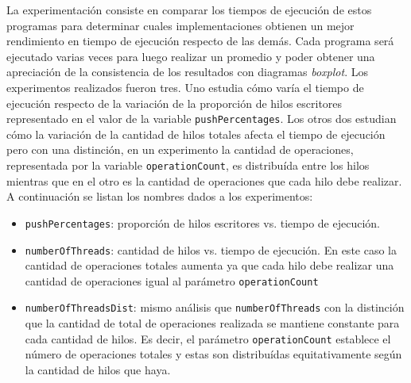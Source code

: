
La experimentación consiste en comparar los tiempos de ejecución de estos programas para determinar cuales implementaciones obtienen un mejor rendimiento en tiempo de ejecución respecto de las demás. Cada programa será ejecutado varias veces para luego realizar un promedio y poder obtener una apreciación de la consistencia de los resultados con diagramas \emph{boxplot}. Los experimentos realizados fueron tres. Uno estudia cómo varía el tiempo de ejecución respecto de la variación de la proporción de hilos escritores representado en el valor de la variable \texttt{pushPercentages}. Los otros dos estudian cómo la variación de la cantidad de hilos totales afecta el tiempo de ejecución pero con una distinción, en un experimento la cantidad de operaciones, representada por la variable \texttt{operationCount}, es distribuída entre los hilos mientras que en el otro es la cantidad de operaciones que cada hilo debe realizar. A continuación se listan los nombres dados a los experimentos:
\begin{itemize}
    \item \texttt{pushPercentages}: proporción de hilos escritores vs. tiempo de ejecución.
    \item \texttt{numberOfThreads}: cantidad de hilos vs. tiempo de ejecución. En este caso la cantidad de operaciones totales aumenta ya que cada hilo debe realizar una cantidad de operaciones igual al parámetro \texttt{operationCount}
    \item \texttt{numberOfThreadsDist}: mismo análisis que \texttt{numberOfThreads} con la distinción que la cantidad de total de operaciones realizada se mantiene constante para cada cantidad de hilos. Es decir, el parámetro \texttt{operationCount} establece el número de operaciones totales y estas son distribuídas equitativamente según la cantidad de hilos que haya.
\end{itemize}

